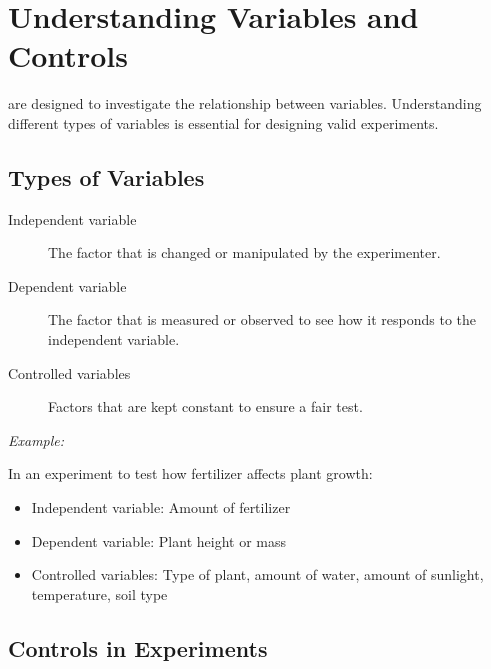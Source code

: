 \documentclass[justified,notoc]{tufte-book}
\newenvironment{keyconcept}[1]{%
    \begin{tcolorbox}[colback=primary!5,colframe=primary,title=\textbf{Key Concept: #1}]
}{%
    \end{tcolorbox}
}
\newenvironment{example}{%
    \par\smallskip\noindent\textit{Example:} 
}{%
    \par\smallskip
}
\begin{document}
\section{Understanding Variables and Controls}

 are designed to investigate the relationship between variables. Understanding different types of variables is essential for designing valid experiments.

\subsection{Types of Variables}

\begin{keyconcept}{Types of Variables}
\begin{description}
    \item[Independent variable] The factor that is changed or manipulated by the experimenter.
    \item[Dependent variable] The factor that is measured or observed to see how it responds to the independent variable.
    \item[Controlled variables] Factors that are kept constant to ensure a fair test.
\end{description}
\end{keyconcept}

    \centering

\begin{example}
In an experiment to test how fertilizer affects plant growth:
\begin{itemize}
    \item Independent variable: Amount of fertilizer
    \item Dependent variable: Plant height or mass
    \item Controlled variables: Type of plant, amount of water, amount of sunlight, temperature, soil type
\end{itemize}
\end{example}

\subsection{Controls in Experiments}
\end{document}
